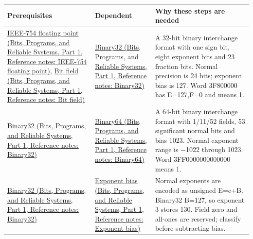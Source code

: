\hypertarget{appendix-4ad47bdd269a-m004---representation-and-rounding-learning-spine}{}

{\def\LTcaptype{none} %
\begin{longtable}[]{@{}
  >{\raggedright\arraybackslash}p{}
  >{\raggedright\arraybackslash}p{}
  >{\raggedright\arraybackslash}p{}@{}}
\toprule\noalign{}
\begin{minipage}[b]{\linewidth}\raggedright
Prerequisites
\end{minipage} & \begin{minipage}[b]{\linewidth}\raggedright
Dependent
\end{minipage} & \begin{minipage}[b]{\linewidth}\raggedright
Why these steps are needed
\end{minipage} \\
\midrule\noalign{}
\endhead
\bottomrule\noalign{}
\endlastfoot
\href{../01-Bits-Programs-and-Reliable-Systems-P01/main.pdf\#nameddest=appendix-343615f49ddf}{IEEE-754 floating point (Bits, Programs, and Reliable Systems, Part 1, Reference notes: IEEE-754 floating point)}, \href{../01-Bits-Programs-and-Reliable-Systems-P01/main.pdf\#nameddest=appendix-ac697f5c66e8}{Bit field (Bits, Programs, and Reliable Systems, Part 1, Reference notes: Bit field)} & \href{../01-Bits-Programs-and-Reliable-Systems-P01/main.pdf\#nameddest=appendix-5057f9ad327f}{Binary32 (Bits, Programs, and Reliable Systems, Part 1, Reference notes: Binary32)} & A 32-bit binary interchange format with one sign bit, eight exponent bits and 23 fraction bits. Normal precision is 24 bits; exponent bias is 127. Word 3F800000 has E=127,F=0 and means 1. \\
\href{../01-Bits-Programs-and-Reliable-Systems-P01/main.pdf\#nameddest=appendix-5057f9ad327f}{Binary32 (Bits, Programs, and Reliable Systems, Part 1, Reference notes: Binary32)} & \href{../01-Bits-Programs-and-Reliable-Systems-P01/main.pdf\#nameddest=appendix-5078dfab64e6}{Binary64 (Bits, Programs, and Reliable Systems, Part 1, Reference notes: Binary64)} & A 64-bit binary interchange format with 1/11/52 fields, 53 significant normal bits and bias 1023. Normal exponent range is −1022 through 1023. Word 3FF0000000000000 means 1. \\
\href{../01-Bits-Programs-and-Reliable-Systems-P01/main.pdf\#nameddest=appendix-5057f9ad327f}{Binary32 (Bits, Programs, and Reliable Systems, Part 1, Reference notes: Binary32)} & \href{../01-Bits-Programs-and-Reliable-Systems-P01/main.pdf\#nameddest=appendix-2fae058c82e1}{Exponent bias (Bits, Programs, and Reliable Systems, Part 1, Reference notes: Exponent bias)} & Normal exponents are encoded as unsigned E=e+B. Binary32 B=127, so exponent 3 stores 130. Field zero and all-ones are reserved; classify before subtracting bias. \\

\end{longtable}}
